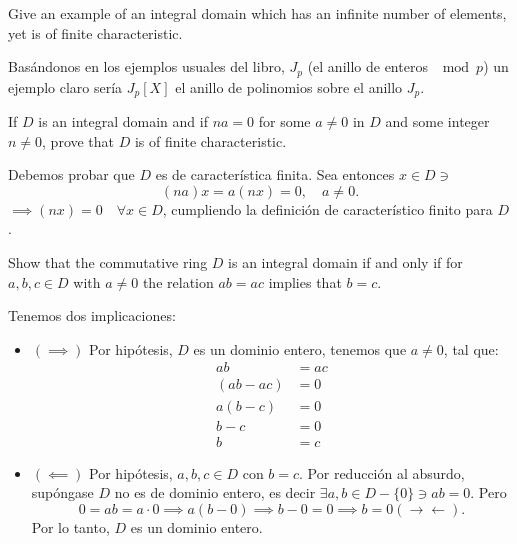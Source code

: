 \begin{problema}[Problema 7]
    Give an example of an integral domain which has an infinite number of elements, yet is of finite characteristic.
    \begin{sol}
        Basándonos en los ejemplos usuales del libro, $J_p$ (el anillo de enteros $\mod p$) un ejemplo claro sería $J_p[X]$ el anillo de polinomios sobre el anillo $J_p$.
    \end{sol}
\end{problema}

\begin{problema}[Problema 8]
    If $D$ is an integral domain and if $n a=0$ for some $a \neq 0$ in $D$ and some integer $n \neq 0$, prove that $D$ is of finite characteristic.
    \begin{dem}
        Debemos probar que $D$ es de característica finita. Sea entonces $x\in D \ni$
        $$ (na)x = a(nx)=0,\quad a\neq 0.$$
        $\implies (nx)=0\quad \forall x\in D$, cumpliendo la definición de característico finito para $D$. 
    \end{dem}
\end{problema}

\begin{problema}[Problema 10]
    Show that the commutative ring $D$ is an integral domain if and only if for $a, b, c \in D$ with $a \neq 0$ the relation $a b=a c$ implies that $b=c$.
    \begin{dem}
        Tenemos dos implicaciones: 
        \begin{itemize}
            \item $(\implies)$ Por hipótesis, $D$ es un dominio entero, tenemos que $a\neq 0$, tal que: 
            \begin{align*}
                ab&=ac\\
                (ab-ac)&=0\\
                a(b-c)&=0\\
                b-c&=0\\
                b&=c
            \end{align*}
            \item $(\impliedby)$ Por hipótesis, $a,b,c\in D$ con $b=c$. Por reducción al absurdo, supóngase $D$ no es de dominio entero, es decir $\exists a,b\in D-\{0\}\ni ab=0$. Pero 
            $$0=ab=a\cdot 0\implies a(b-0)\implies b-0=0\implies b=0(\to\gets).$$
            Por lo tanto, $D$ es un dominio entero.  
        \end{itemize}
    \end{dem}
\end{problema}

